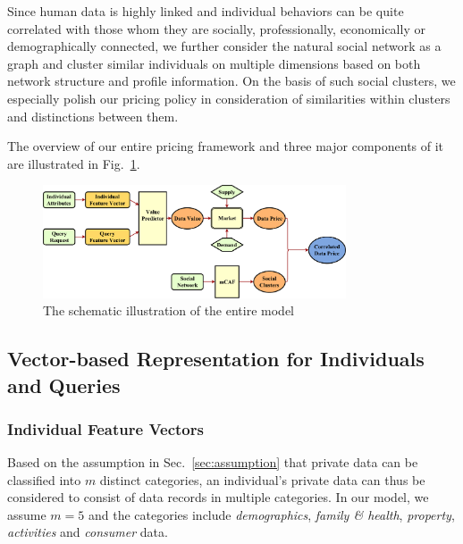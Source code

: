 \documentclass{mcmthesis}
\begin{document}
Since human data is highly linked and individual behaviors can be quite correlated with those whom they are socially, professionally, economically or demographically connected, we further consider the natural social network as a graph and cluster similar individuals on multiple dimensions based on both network structure and profile information. On the basis of such social clusters, we especially polish our pricing policy in consideration of similarities within clusters and distinctions between them.

The overview of our entire pricing framework and three major components of it are illustrated in Fig.~\ref{fig:overview}.

\begin{figure}[htbp]
    \centering
    \includegraphics[width=0.8\textwidth]{fig/overview.pdf}
    \caption{The schematic illustration of the entire model}
    \label{fig:overview}
\end{figure}

\subsection{Vector-based Representation for Individuals and Queries}
\label{sec:vectors}

\subsubsection{Individual Feature Vectors}
\label{sec:individual_vec}

Based on the assumption in Sec.~\ref{sec:assumption} that private data can be classified into $m$ distinct categories, an individual's private data can thus be considered to consist of data records in multiple categories. In our model, we assume $m = 5$ and the categories include \emph{demographics}, \emph{family \& health}, \emph{property}, \emph{activities} and \emph{consumer} data.
\end{document}

